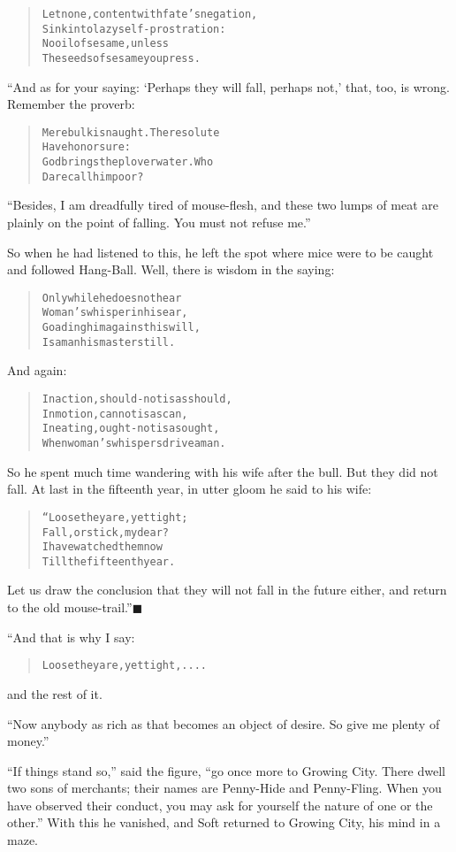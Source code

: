 \documentclass[article, twoside, 14pt]{memoir}
\newcommand{\qed}{\hfill \ensuremath{\blacksquare}}
\renewenvironment{verbatim}{%
\begin{quote}%
\vskip -10pt%
\begin{alltt}\normalfont\large}{\end{alltt}%
\end{quote}%
\vskip -10pt
} %
\begin{document}
\begin{verbatim}
Let none, content with fate's negation,
Sink into lazy self-prostration:
No oil of sesame, unless
The seeds of sesame you press.
\end{verbatim}
“And as for your saying: `Perhaps they will fall, perhaps not,'
that, too, is wrong. Remember the proverb:

\begin{verbatim}
Mere bulk is naught. The resolute
    Have honor sure:
God brings the plover water. Who
    Dare call him poor?
\end{verbatim}
``Besides, I am dreadfully tired of mouse-flesh, and these two lumps of meat are plainly on the point of falling. You must not refuse me.''

So when he had listened to this, he left the spot where mice were
to be caught and followed Hang-Ball. Well, there is wisdom in the
saying:

\begin{verbatim}
Only while he does not hear
Woman's whisper in his ear,
Goading him against his will,
Is a man his master still.
\end{verbatim}
And again:

\begin{verbatim}
In action, should-not is as should,
    In motion, cannot is as can,
In eating, ought-not is as ought,
    When woman's whispers drive a man.
\end{verbatim}
So he spent much time wandering with his wife after the bull. But
they did not fall. At last in the fifteenth year, in utter gloom he
said to his wife:

\begin{verbatim}
“Loose they are, yet tight;
    Fall, or stick, my dear?
I have watched them now
    Till the fifteenth year.
\end{verbatim}
Let us draw the conclusion that they will not fall in the future
either, and return to the old mouse-trail.”\hyperref[s43]{\qed}

“And that is why I say:

\begin{verbatim}
Loose they are, yet tight, ....
\end{verbatim}
and the rest of it.

``Now anybody as rich as that becomes an object of desire. So give me plenty of money.''

``If things stand so,'' said the figure,
``go once more to Growing City. There dwell two sons of merchants; their names are Penny-Hide and Penny-Fling. When you have observed their conduct, you may ask for yourself the nature of one or the other.''
With this he vanished, and Soft returned to Growing City, his mind
in a maze.
\end{document}
